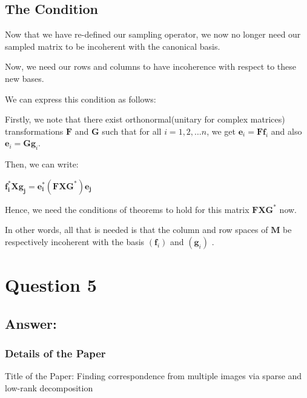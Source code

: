 \documentclass[fleqn, 11pt]{article}
\newcommand{\bs}[1]{\boldsymbol{#1}}
\begin{document}
\subsection*{The Condition}

Now that we have re-defined our sampling operator, we now no longer need our sampled
matrix to be incoherent with the canonical basis. 

\smallskip

Now, we need our rows and columns to have incoherence 
with respect to these new bases.

\smallskip

We can express this condition as follows:

\smallskip

Firstly, we note that there exist orthonormal(unitary for complex matrices) 
transformations $\bs{F}$ and $\bs{G}$ such that for all $i = 1,2,\ldots n$, we get 
$\bs{e}_i = \bs{Ff}_i$ and also $\bs{e}_i = \bs{Gg}_i$.

\smallskip

Then, we can write:
\begin{center}
    $\bs{f_i^* X g_j} =  \bs{  e_i^*  (F X G^*) e_j    }  $
\end{center}

Hence, we need the conditions of theorems to hold for this matrix $\bs{F X G^*}$ now. 


\medskip

In other words, all that is needed is that the
column and row spaces of $\bs{M}$  
be respectively 
incoherent with the basis $(\bs{f}_i)$ and $(\bs{g}_i)$ . 



\newpage
\section*{Question 5}
\setcounter{equation}{0}

\subsection*{Answer: }

\subsubsection*{Details of the Paper}

Title of the Paper: Finding correspondence from multiple images via sparse and low-rank decomposition
\end{document}

